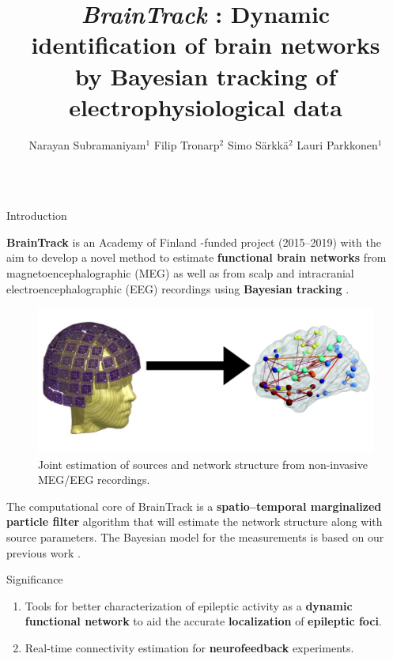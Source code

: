 \documentclass[serif,final]{beamer}
\title{\textit{BrainTrack} : Dynamic identification of brain networks \\ by Bayesian tracking of electrophysiological data}
\author{Narayan Subramaniyam$^{1}$ \quad Filip Tronarp$^{2}$ \quad Simo S\"arkk\"a$^{2}$ \quad Lauri Parkkonen$^{1}$}
\institute{$^{1}$ Department of Neuroscience and Biomedical Engineering \\ $^{2}$ Department of Electrical Engineering and Automation}
\begin{document}
\begin{frame}{}
  \begin{columns}[t]

    \begin{column}{0.45\linewidth}

      \begin{block}{Introduction}
      \begin{flushleft}
			\textbf{\color{blue} BrainTrack} is an Academy of Finland -funded project (2015--2019) with the \\ aim to develop a novel method to estimate \textbf{\color{blue}functional brain networks} from magnetoencephalographic (MEG) as well as from scalp and intracranial electroencephalographic (EEG) recordings using \textbf{\color{blue} Bayesian tracking} \cite{sarkka2013bayesian}.
	\end{flushleft}
    \begin{figure}
          \centering
          \includegraphics[scale=0.75]{intro_1}
          \caption{Joint estimation of sources and network structure from non-invasive MEG/EEG recordings.}
           \label{fig1}
    \end{figure}
The computational core of BrainTrack is a \textbf{\color{blue} spatio--temporal marginalized particle filter} algorithm \cite{sarkka2013bayesian} that will estimate the network structure along with source parameters. The Bayesian model for the measurements is based on our previous work \cite{sorrentino2009dynamical,chen2015bayesian}.
    \end{block}

    \begin{block}{Significance}
        \begin{enumerate}
		\setlength\itemsep{0.25em}
		\item Tools for better characterization of epileptic activity as a \textbf{\color {blue} dynamic functional network} to aid the accurate 	\textbf{\color {blue} localization} of \textbf{\color {blue} epileptic foci}.
		\item Real-time connectivity estimation for \textbf{\color {blue} neurofeedback} experiments.
		\end{enumerate}
    \end{block}


\end{column}
\end{columns}
\end{frame}
\end{document}
